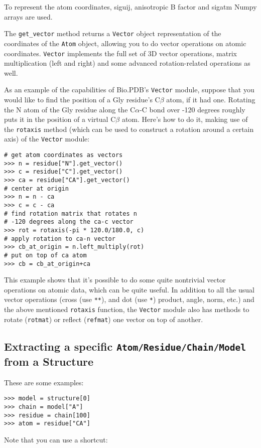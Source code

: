 To represent the atom coordinates, siguij, anisotropic B factor and sigatm Numpy
arrays are used.

The \texttt{get\_vector} method returns a \texttt{Vector} object representation of the coordinates of the \texttt{Atom} object, allowing you to do vector operations on atomic coordinates. \texttt{Vector} implements the full set of 3D vector operations, matrix multiplication (left and right) and some advanced rotation-related operations as well.

As an example of the capabilities of Bio.PDB's \texttt{Vector} module,
suppose that you would like to find the position of a Gly residue's C$\beta$
atom, if it had one. Rotating the N atom of
the Gly residue along the C$\alpha$-C bond over -120 degrees roughly
puts it in the position of a virtual C$\beta$ atom. Here's how to
do it, making use of the \texttt{rotaxis} method (which can be used
to construct a rotation around a certain axis) of the \texttt{Vector}
module:

\begin{verbatim}
# get atom coordinates as vectors
>>> n = residue["N"].get_vector()
>>> c = residue["C"].get_vector()
>>> ca = residue["CA"].get_vector()
# center at origin
>>> n = n - ca
>>> c = c - ca
# find rotation matrix that rotates n
# -120 degrees along the ca-c vector
>>> rot = rotaxis(-pi * 120.0/180.0, c)
# apply rotation to ca-n vector
>>> cb_at_origin = n.left_multiply(rot)
# put on top of ca atom
>>> cb = cb_at_origin+ca
\end{verbatim}
This example shows that it's possible to do some quite nontrivial
vector operations on atomic data, which can be quite useful. In addition
to all the usual vector operations (cross (use \texttt{{*}{*}}), and
dot (use \texttt{{*}}) product, angle, norm, etc.) and the above mentioned
\texttt{rotaxis} function, the \texttt{Vector} module also has methods
to rotate (\texttt{rotmat}) or reflect (\texttt{refmat}) one vector
on top of another.

\subsection{Extracting a specific \texttt{Atom/\-Residue/\-Chain/\-Model}
from a Structure}

These are some examples:

\begin{verbatim}
>>> model = structure[0]
>>> chain = model["A"]
>>> residue = chain[100]
>>> atom = residue["CA"]
\end{verbatim}
Note that you can use a shortcut:

